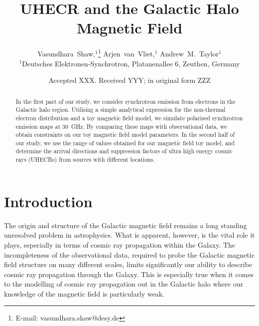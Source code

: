 \documentclass[usenatbib]{mnras}
\title{UHECR and the Galactic Halo Magnetic Field}
\author[V.~Shaw et al.]{
Vasundhara~Shaw,$^{1}$\thanks{E-mail: vasundhara.shaw@desy.de}
Arjen~van~Vliet,$^{1}$
Andrew~M.~Taylor$^{1}$
\\
$^{1}$Deutsches Elektronen-Synchrotron, Platanenallee 6, Zeuthen, Germany
}
\date{Accepted XXX. Received YYY; in original form ZZZ}
\begin{document}
\maketitle

\begin{abstract}
In the first part of our study, we consider synchrotron emission from electrons in the Galactic halo region. Utilising a simple analytical expression for the non-thermal electron distribution and a toy magnetic field model, we simulate polarised synchrotron emission maps at 30~GHz. By comparing these maps with observational data, we obtain constraints on our toy magnetic field model parameters. In the second half of our study, we use the range of values obtained for our magnetic field toy model, and determine the arrival directions and suppression factors of ultra high energy cosmic rays (UHECRs) from sources with different locations.
\end{abstract}



\section{Introduction}
\label{Introducion}

The origin and structure of the Galactic magnetic field remains a long standing unresolved problem in astrophysics. What is apparent, however, is the vital role it plays, especially in terms of cosmic ray propagation within the Galaxy. The incompleteness of the observational data, required to probe the Galactic magnetic field structure on many different scales, limits significantly our ability to describe cosmic ray propagation through the Galaxy. This is especially true when it comes to the modelling of cosmic ray propagation out in the Galactic halo where our knowledge of the magnetic field is particularly weak.
\end{document}
